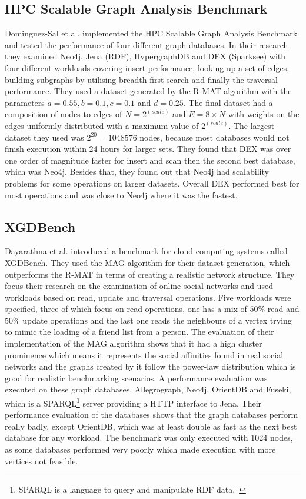 \subsection{HPC Scalable Graph Analysis Benchmark}
Dominguez-Sal et al. implemented the HPC Scalable Graph Analysis Benchmark and tested the performance of four different graph databases.
In their research they examined Neo4j, Jena (RDF), HypergraphDB and DEX (Sparksee) with four different workloads covering insert performance, looking up a set of edges, building subgraphs by utilising breadth first search and finally the traversal performance.
They used a dataset generated by the R-MAT algorithm with the parameters $ a = 0.55, b = 0.1, c = 0.1 $ and $ d = 0.25 $.
The final dataset had a composition of nodes to edges of $ N = 2^(scale) $ and $ E = 8 \times N $ with weights on the edges uniformly distributed with a maximum value of $ 2^(scale) $.
The largest dataset they used was $ 2^20 = 1048576 $ nodes,
because most databases would not finish execution within 24 hours for larger sets.
They found that DEX was over one order of magnitude faster for insert and scan then the second best database,
which was Neo4j.
Besides that,
they found out that Neo4j had scalability problems for some operations on larger datasets.
Overall DEX performed best for most operations and was close to Neo4j where it was the fastest.~\cite{TaoShen}

\subsection{XGDBench}
Dayarathna et al. introduced a benchmark for cloud computing systems called XGDBench.
They used the MAG algorithm for their dataset generation,
which outperforms the R-MAT in terms of creating a realistic network structure.
They focus their research on the examination of online social networks and used workloads based on read, update and traversal operations.
Five workloads were specified, three of which focus on read operations, one has a mix of $ 50\% $ read and $ 50\% $ update operations and the last one reads the neighbours of a vertex trying to mimic the loading of a friend list from a person.
The evaluation of their implementation of the MAG algorithm shows that it had a high cluster prominence which means it represents the social affinities found in real social networks and the graphs created by it follow the power-law distribution which is good for realistic benchmarking scenarios.
A performance evaluation was executed on these graph databases,
Allegrograph, Neo4j, OrientDB and Fuseki,
which is a SPARQL\footnote{SPARQL is a language to query and manipulate RDF data.~\cite{Harris2013}} server providing a HTTP interface to Jena.
Their performance evaluation of the databases shows that the graph databases perform really badly,
except OrientDB,
which was at least double as fast as the next best database for any workload.
The benchmark was only executed with 1024 nodes,
as some databases performed very poorly which made execution with more vertices not feasible.~\cite{Dayarathna2012}

